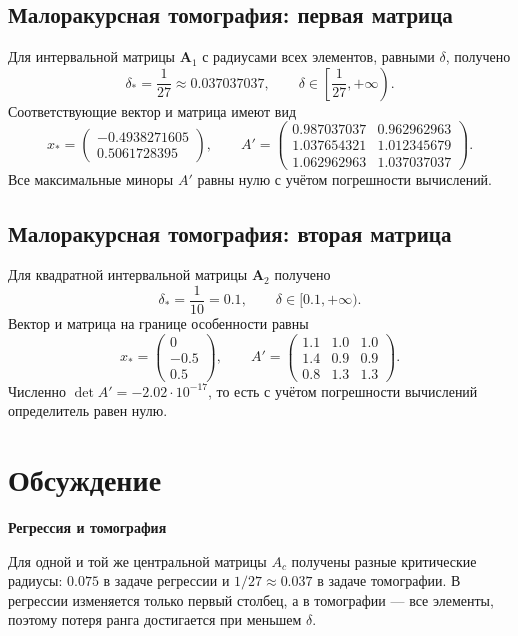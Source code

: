 \documentclass[12pt,a4paper]{article}
\numberwithin{equation}{section}
\newcommand{\theorypart}[1]{%
    \par\medskip
    \noindent\textbf{#1}\par\nopagebreak\smallskip
}
\begin{document}
\subsection{Малоракурсная томография: первая матрица}

Для интервальной матрицы $\boldsymbol{A}_1$ с радиусами всех элементов,
равными $\delta$, получено
\[
    \delta_*=\frac{1}{27}\approx0.037037037,
    \qquad
    \delta\in\left[\frac{1}{27},+\infty\right).
\]
Соответствующие вектор и матрица имеют вид
\[
    x_*=\begin{pmatrix}
        -0.4938271605\\
         0.5061728395
    \end{pmatrix},
    \qquad
    A'=\begin{pmatrix}
        0.987037037 & 0.962962963 \\
        1.037654321 & 1.012345679 \\
        1.062962963 & 1.037037037
    \end{pmatrix}.
\]
Все максимальные миноры $A'$ равны нулю с учётом погрешности вычислений.

\subsection{Малоракурсная томография: вторая матрица}

Для квадратной интервальной матрицы $\boldsymbol{A}_2$ получено
\[
    \delta_*=\frac{1}{10}=0.1,
    \qquad
    \delta\in[0.1,+\infty).
\]
Вектор и матрица на границе особенности равны
\[
    x_*=\begin{pmatrix}0\\-0.5\\0.5\end{pmatrix},
    \qquad
    A'=\begin{pmatrix}
        1.1 & 1.0 & 1.0 \\
        1.4 & 0.9 & 0.9 \\
        0.8 & 1.3 & 1.3
    \end{pmatrix}.
\]
Численно $\det A'=-2.02\cdot10^{-17}$, то есть с учётом погрешности
вычислений определитель равен нулю.

\section{Обсуждение}

\theorypart{Регрессия и томография}
Для одной и той же центральной матрицы $A_c$ получены разные критические
радиусы: $0.075$ в задаче регрессии и $1/27\approx0.037$ в задаче
томографии. В регрессии изменяется только первый столбец, а в томографии
--- все элементы, поэтому потеря ранга достигается при меньшем $\delta$.
\end{document}
